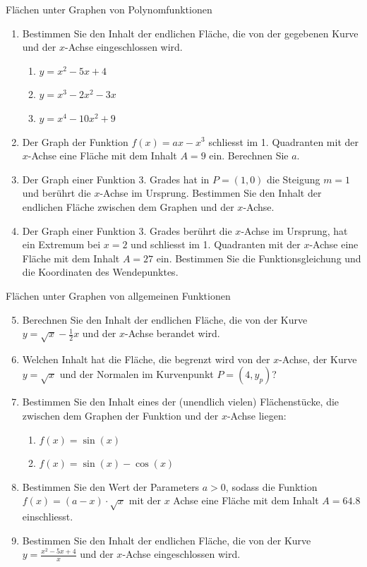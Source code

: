 \clearpage
\begin{ueb}{Flächen unter Graphen von Polynomfunktionen}{}
	\begin{enumerate}
		\item Bestimmen Sie den Inhalt der endlichen Fläche, die von der gegebenen Kurve und der \(x\)-Achse eingeschlossen wird.
		      \begin{enumerate}
			      \item \(y=x^2-5x+4\)
			      \item \(y=x^3-2x^2-3x\)
			      \item \(y=x^4-10x^2+9\)
		      \end{enumerate}
		\item Der Graph der Funktion \(f(x) = ax-x^3\) schliesst im 1. Quadranten mit der \(x\)-Achse eine Fläche mit dem Inhalt \(A=9\) ein. Berechnen Sie \(a\).
		\item Der Graph einer Funktion 3. Grades hat in \(P=(1, 0)\) die Steigung \(m=1\) und berührt die \(x\)-Achse im Ursprung. Bestimmen Sie den Inhalt der endlichen Fläche zwischen dem Graphen und der \(x\)-Achse.
		\item Der Graph einer Funktion 3. Grades berührt die \(x\)-Achse im Ursprung, hat ein Extremum bei \(x=2\) und schliesst im 1. Quadranten mit der \(x\)-Achse eine Fläche mit dem Inhalt \(A=27\) ein. Bestimmen Sie die Funktionsgleichung und die Koordinaten des Wendepunktes.
	\end{enumerate}
\end{ueb}
\begin{ueb}{Flächen unter Graphen von allgemeinen Funktionen}{}
	\begin{enumerate}\setcounter{enumi}{4}
		\item Berechnen Sie den Inhalt der endlichen Fläche, die von der Kurve \(y=\sqrt{x}-\frac{1}{2}x\) und der \(x\)-Achse berandet wird.
		\item Welchen Inhalt hat die Fläche, die begrenzt wird von der \(x\)-Achse, der Kurve \(y=\sqrt{x}\) und der Normalen im Kurvenpunkt \(P=(4, y_p)\)?
		\item Bestimmen Sie den Inhalt eines der (unendlich vielen) Flächenstücke, die zwischen dem Graphen der Funktion und der \(x\)-Achse liegen:
		      \begin{enumerate}
			      \item \(f(x) = \sin(x)\)
			      \item \(f(x) = \sin(x) - \cos(x)\)
		      \end{enumerate}
		\item Bestimmen Sie den Wert der Parameters \(a>0\), sodass die Funktion \(f(x) = (a-x)\cdot \sqrt{x}\) mit der \(x\) Achse eine Fläche mit dem Inhalt \(A=64.8\) einschliesst.
		\item Bestimmen Sie den Inhalt der endlichen Fläche, die von der Kurve \(y=\frac{x^2-5x+4}{x}\) und der \(x\)-Achse eingeschlossen wird.
	\end{enumerate}
\end{ueb}

